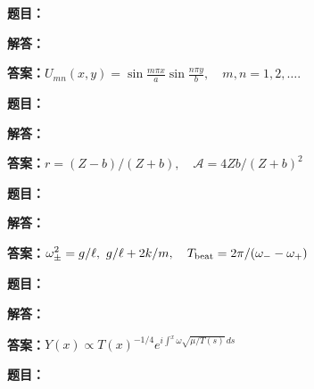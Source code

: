 \documentclass[lang=cn,color=blue,11pt]{elegantbook}
\begin{document}
\noindent\textbf{题目：}
\par\noindent\textbf{解答：}
\par\noindent\textbf{答案：}\(\displaystyle 
U_{mn}(x,y)=\sin\frac{m\pi x}{a}\sin\frac{n\pi y}{b},
\quad m,n=1,2,\ldots.
\)\par
\par\smallskip\noindent\hrulefill\par\medskip
{}\par
\noindent\textbf{题目：}
\par\noindent\textbf{解答：}
\par\noindent\textbf{答案：}\(\displaystyle r=(Z-b)/(Z+b),\quad\mathcal A=4Zb/(Z+b)^2\)\par
\par\smallskip\noindent\hrulefill\par\medskip
{}\par
\noindent\textbf{题目：}
\par\noindent\textbf{解答：}
\par\noindent\textbf{答案：}\(\displaystyle \omega_\pm^2=g/\ell,\ g/\ell+2k/m,\quad T_{\rm beat}=2\pi/(\omega_--\omega_+)\)\par
\par\smallskip\noindent\hrulefill\par\medskip
{}\par
\noindent\textbf{题目：}
\par\noindent\textbf{解答：}
\par\noindent\textbf{答案：}\(\displaystyle Y(x)\propto T(x)^{-1/4}e^{i\int^x\omega\sqrt{\mu/T(s)}\,ds}\)\par
\par\smallskip\noindent\hrulefill\par\medskip
{}\par
\noindent\textbf{题目：}
\end{document}
